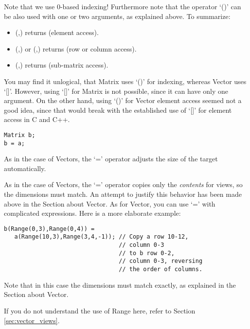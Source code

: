 Note that we use 0-based indexing! Furthermore note that the operator
`()' can be also used with one or two  arguments, as
explained above. To summarize:

\begin{itemize}
\item (,) returns  (element access).
\item (,) or (,) returns
   (row or column access).
\item (,) returns 
  (sub-matrix access).
\end{itemize}

You may find it unlogical, that Matrix uses `()' for indexing, whereas
Vector uses `[]'. However, using `[]' for Matrix is not possible,
since it can have only one argument. On the other hand, using `()' for
Vector element access seemed not a good idea, since that would break
with the established use of `[]' for element access in C and C++.

\begin{verbatim}
Matrix b;
b = a;
\end{verbatim}

As in the case of Vectors, the `=' operator adjusts the size of the
target automatically.


As in the case of Vectors, the `=' operator copies only the
\emph{contents} for views, so the dimensions must match. An attempt to justify
this behavior has been made above in the Section about Vector. As for
Vector, you can use `=' with complicated expressions. Here is a more
elaborate example:

\begin{verbatim}
b(Range(0,3),Range(0,4)) =
   a(Range(10,3),Range(3,4,-1)); // Copy a row 10-12,
                                 // column 0-3
                                 // to b row 0-2,
                                 // column 0-3, reversing
                                 // the order of columns.
\end{verbatim}
Note that in this case the dimensions must match exactly, as explained
in the Section about Vector.

If you do not understand the use of Range here, refer to Section
\ref{sec:vector_views}. 

